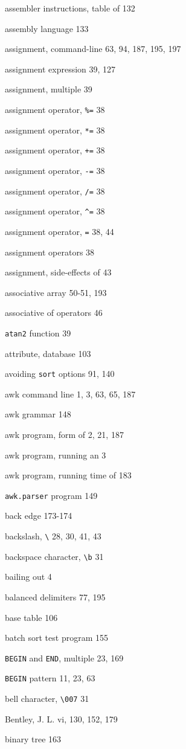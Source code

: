 \begin{multicols}{3}
assembler instructions, table of 132

assembly language 133

assignment, command-line 63, 94, 187, 195, 197

assignment expression 39, 127

assignment, multiple 39

assignment operator, \verb'%=' 38

assignment operator, \verb'*=' 38

assignment operator, \verb'+=' 38

assignment operator, \verb'-=' 38

assignment operator, \verb'/=' 38

assignment operator, \verb'^=' 38

assignment operator, \verb'=' 38, 44

assignment operators 38 

assignment, side-effects of 43

associative array 50-51, 193

associative of operators 46

\verb'atan2' function 39

attribute, database 103

avoiding \verb'sort' options 91, 140

awk command line 1, 3, 63, 65, 187

awk grammar 148

awk program, form of 2, 21, 187

awk program, running an 3

awk program, running time of 183

\verb'awk.parser' program 149

back edge 173-174

backslash, \verb'\' 28, 30, 41, 43

backspace character, \verb'\b' 31

bailing out 4

balanced delimiters 77, 195

base table 106

batch sort test program 155

\verb'BEGIN' and \verb'END', multiple 23, 169

\verb'BEGIN' pattern 11, 23, 63

bell character, \verb'\007' 31

Bentley, J. L. vi, 130, 152, 179

binary tree 163


\end{multicols}
